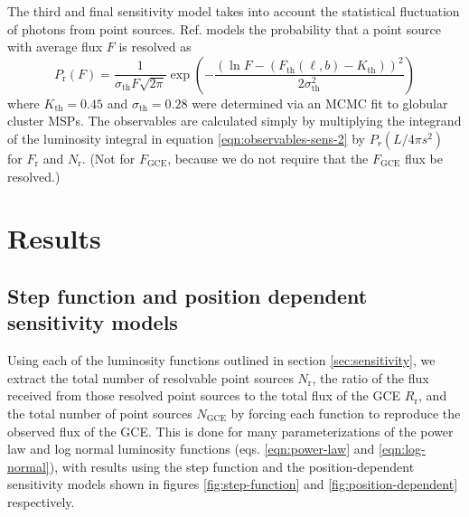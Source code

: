 \documentclass[a4paper,11pt]{article}
\newcommand{\parens}[1]{\left(#1\right)}
\newcommand{\expp}[1]{\exp \parens{#1}}
\begin{document}
The third and final sensitivity model takes into account the statistical fluctuation of photons from point sources. Ref. \cite{Ploeg:2020jeh} models the probability that a point source with average flux $F$ is resolved as
\begin{equation}
    P_\text{r}(F) = \frac{1}{\sigma_\text{th} F\sqrt{2\pi}} \expp{-\frac{(\ln F - (F_\text{th}(\ell, b) - K_\text{th}))^2}{2\sigma_\text{th}^2}}
    \label{eqn:ploeg-smoothing}
\end{equation}
where $K_\text{th} = 0.45$ and $\sigma_\text{th} = 0.28$ were determined via an MCMC fit to globular cluster MSPs. The observables are calculated simply by multiplying the integrand of the luminosity integral in equation \ref{eqn:observables-sens-2} by $P_r(L/4\pi s^2)$ for $F_\text{r}$ and $N_\text{r}$. (Not for $F_\text{GCE}$, because we do not require that the $F_\text{GCE}$ flux be resolved.)






\section{Results}
\subsection{Step function and position dependent sensitivity models}
Using each of the luminosity functions outlined in section \ref{sec:sensitivity}, we extract the total number of resolvable point sources $N_\text{r}$, the ratio of the flux received from those resolved point sources to the total flux of the GCE $R_\text{r}$, and the total number of point sources $N_\text{GCE}$ by forcing each function to reproduce the observed flux of the GCE. This is done for many parameterizations of the power law and log normal luminosity functions (eqs. \ref{eqn:power-law} and \ref{eqn:log-normal}), with results using the step function and the position-dependent sensitivity models shown in figures \ref{fig:step-function} and \ref{fig:position-dependent} respectively.
\end{document}
